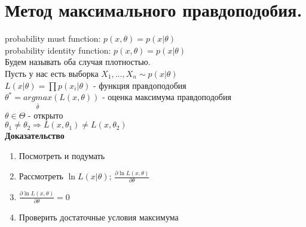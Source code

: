 \documentclass{article}
\newcommand\0{\mathbb{0}}
\newcommand\1{\mathbb{1}}
\begin{document}
\section{Метод максимального правдоподобия.}
probability must function: $p(x, \theta) = p(x|\theta)$\\
probability identity function: $p(x, \theta) = p(x|\theta)$\\
Будем называть оба случая плотностью.\\
Пусть у нас есть выборка $X_1, \dots, X_n \sim p(x|\theta)$\\
$L(x|\theta) = \displaystyle\prod p(x_i|\theta)$ - функция правдоподобия\\
$\theta^* = \underset{\widehat{\theta}}{argmax}(L(x, \theta))$ - оценка максимума правдоподобия\\
$\theta \in \Theta$ - открыто\\
$\theta_1 \neq \theta_2 \Rightarrow L(x,\theta_1) \neq L(x, \theta_2)$\\
\textbf{Доказательство}
\begin{enumerate}
    \item Посмотреть и подумать
    \item Рассмотреть $\ln{L(x|\theta)}$; $\frac{\partial \ln{L(x, \theta)}}{\partial \theta}$
    \item $\frac{\partial \ln{L(x, \theta)}}{\partial \theta} = 0$
    \item Проверить достаточные условия максимума
\end{enumerate}\
\end{document}
